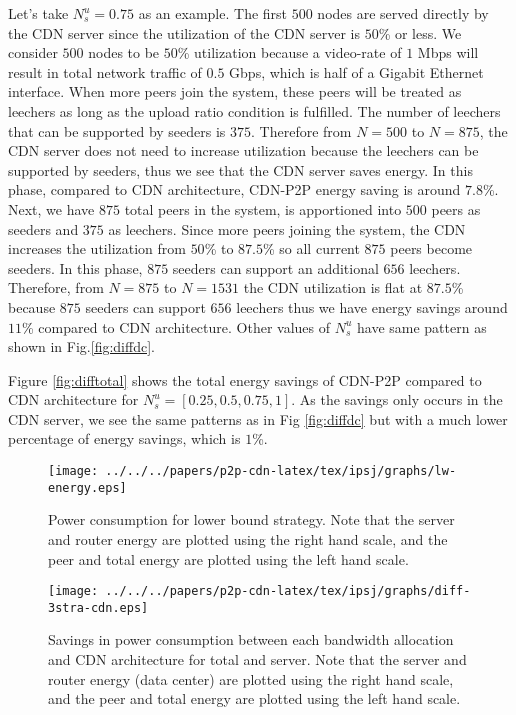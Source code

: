 Let’s take $N_s^u=0.75$ as an example. 
The first $500$ nodes are served directly by the CDN server since the utilization of the CDN server is $50$\% or less. 
We consider $500$ nodes to be $50$\% utilization because a video-rate of $1$ Mbps will result in total network traffic of $0.5$ Gbps, which is half of a Gigabit Ethernet interface. 
When more peers join the system, these peers will be treated as leechers as long as the upload ratio condition is fulfilled. 
The number of leechers that can be supported by seeders is $375$. Therefore from $N=500$ to $N=875$, the CDN server does not need to increase utilization because the leechers can be supported by seeders, thus we see that the CDN server saves energy. 
In this phase, compared to CDN architecture, CDN-P2P energy saving is around $7.8$\%. Next, we have $875$ total peers in the system, is apportioned into $500$ peers as seeders and $375$ as leechers.  
Since more peers joining the system, the CDN increases the utilization from $50$\% to $87.5$\% so all current $875$ peers become seeders. 
In this phase, $875$ seeders can support an additional $656$ leechers. 
Therefore, from $N=875$ to $N=1531$ the CDN utilization is flat at $87.5$\% because $875$ seeders can support $656$ leechers thus we have energy savings around $11$\% compared to CDN architecture. 
Other values of $N_s^u$ have same pattern as shown in Fig.\ref{fig:diffdc}.

Figure \ref{fig:difftotal} shows the total energy savings of CDN-P2P compared to CDN architecture for $N_s^u=[0.25,0.5,0.75,1]$.  
As the savings only occurs in the CDN server, we see the same patterns as in Fig \ref{fig:diffdc} but with a much lower percentage of energy savings, which is $1$\%.

\begin{figure}[h]
\begin{center}
\texttt{[image: ../../../papers/p2p-cdn-latex/tex/ipsj/graphs/lw-energy.eps]}
\end{center}
\caption{Power consumption for lower bound strategy. Note that the server and router energy are plotted using the right hand scale, and the peer and total energy are plotted using the left hand scale.}
\label{fig:lwenergy}
\vspace{-2mm}
\end{figure} 

\begin{figure}[h]
\begin{center}
\texttt{[image: ../../../papers/p2p-cdn-latex/tex/ipsj/graphs/diff-3stra-cdn.eps]}
\end{center}
\caption{Savings in power consumption between each bandwidth allocation and CDN architecture for total and server.
Note that the server and router energy (data center) are plotted using the right hand scale, and the peer and total energy are plotted using the left hand scale.}
\label{fig:diff3stra}
\vspace{-2mm}
\end{figure} 

